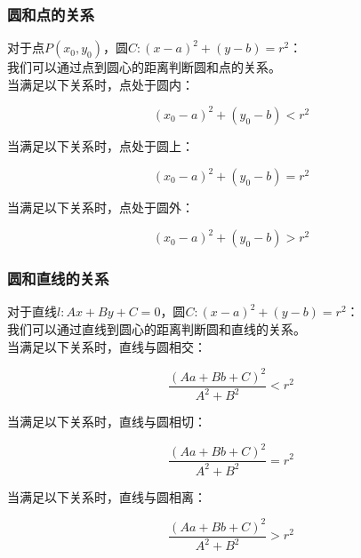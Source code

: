 \documentclass[UTF8]{ctexart}
\begin{document}
\newpage

\subsubsection{圆和点的关系}
    对于点$P(x_0,y_0)$，圆$C:(x-a)^2+(y-b)=r^2$：\\[3mm]
    我们可以通过点到圆心的距离判断圆和点的关系。\\[5mm]
    当满足以下关系时，点处于圆内：
    \begin{large}
        \begin{equation*}
            (x_0-a)^2+(y_0-b)<r^2
        \end{equation*}
    \end{large}
    \vspace{5pt}
    当满足以下关系时，点处于圆上：
    \begin{large}
        \begin{equation*}
            (x_0-a)^2+(y_0-b)=r^2
        \end{equation*}
    \end{large}
    \vspace{5pt}
    当满足以下关系时，点处于圆外：
    \begin{large}
        \begin{equation*}
            (x_0-a)^2+(y_0-b)>r^2
        \end{equation*}
    \end{large}

\subsubsection{圆和直线的关系}
    对于直线$l:Ax+By+C=0$，圆$C:(x-a)^2+(y-b)=r^2$：\\[3mm]
    我们可以通过直线到圆心的距离判断圆和直线的关系。\\[5mm]
    当满足以下关系时，直线与圆相交：
    \begin{large}
        \begin{equation*}
            \frac{\left(Aa+Bb+C\right)^2}{A^2+B^2}<r^2
        \end{equation*}
    \end{large}
    \vspace{5pt}
    当满足以下关系时，直线与圆相切：
    \begin{large}
        \begin{equation*}
            \frac{\left(Aa+Bb+C\right)^2}{A^2+B^2}=r^2
        \end{equation*}
    \end{large}
    \vspace{5pt}
    当满足以下关系时，直线与圆相离：
    \begin{large}
        \begin{equation*}
            \frac{\left(Aa+Bb+C\right)^2}{A^2+B^2}>r^2
        \end{equation*}
    \end{large}
\end{document}
